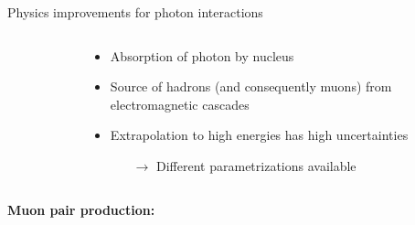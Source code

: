 \documentclass[t]{beamer}
\begin{document}
\begin{columns}[onlytextwidth]
\begin{column}{\textwidth}
\begin{block}{Physics improvements for photon interactions}
\begin{minipage}[t]{0.3\textwidth}
\begin{minipage}[t][11cm]{\textwidth}
\begin{columns}[onlytextwidth]
\begin{column}{0.35\textwidth}
\begin{figure}
\begin{tikzpicture}[>=stealth', pos=.55, photon/.style={decorate,decoration={snake,post length=2mm}}]
                    \end{tikzpicture}
                    \end{figure}
                \end{column}
                \begin{column}{0.6\textwidth}%
                  \begin{itemize}[leftmargin=0.5cm]
                    \item Absorption of photon by nucleus
                    \item Source of hadrons (and consequently muons) from electromagnetic cascades
                    \item Extrapolation to high energies has high uncertainties
                    \begin{itemize}
                      \item[$\rightarrow$] Different parametrizations available
                    \end{itemize}
                  \end{itemize}
                \end{column}                
            \end{columns}    
          \end{minipage}
          \begin{minipage}[t][10cm]{\textwidth}
            {\Large\textbf{Muon pair production:}}
            \begin{columns}[onlytextwidth]
                \begin{column}{0.35\textwidth}%
                  \begin{figure}
\end{figure}
\end{column}
\end{columns}
\end{minipage}
\end{minipage}
\end{block}
\end{column}
\end{columns}
\end{document}
